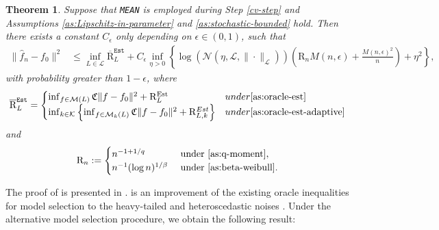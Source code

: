 \documentclass[12pt]{article}
\newtheorem{theorem}{Theorem}[section]
\begin{document}
\begin{theorem}\label{thm:R2Q2}
    Suppose that \texttt{MEAN} is employed during Step \ref{cv-step} and Assumptions \ref{as:Lipschitz-in-parameter} and \ref{as:stochastic-bounded} hold. Then there exists a constant $C_\epsilon$ only depending on $\epsilon \in (0,1)$, such that 
            \begin{equation}
            \begin{aligned}
        \|\widehat{f}_n-f_0\|^2 &\le  \inf_{L\in \mathcal{L}}\overline{\mathrm{R}}_L^{\mathtt{Est}} + C_\epsilon\inf _{\eta>0}\left\{\log \left(\mathcal{N}\left(\eta, \mathcal{L}, \|\cdot\|_{\mathcal{L}}\right)\right)\left(\mathrm{R}_n M(n,\epsilon)+\frac{M(n,\epsilon)^2}{n }\right)+\eta^2\right\},
            \end{aligned}
    \end{equation}
    with probability greater than $1-\epsilon$, where
    \begin{equation}\label{eq:estimationg_rate}
        \overline{\mathrm{R}}_{L}^{\mathtt{Est}} = 
        \begin{cases}
        \inf_{f\in \mathcal{M}(L)}\mathfrak{C}\|f - f_0\|^2 + \mathrm{R}_{L}^{\mathrm{Est}} & \textrm{under \Cref{as:oracle-est} } \\
       \inf_{k \in\mathcal{K} }\left\{\inf_{f\in \mathcal{M}_k(L)}\mathfrak{C}\| f-f_0\|^2 + \mathrm{R}_{L,k}^{\rm Est}\right\} & \textrm{under \Cref{as:oracle-est-adaptive} }
        \end{cases}
    \end{equation}
    and
    \begin{align}\label{eq:rate_under_LSE}
    	\mathrm{R}_n := \begin{cases}
    		n^{-1+1/q} &\text{ under }\Cref{as:q-moment},\\
    		n^{-1}(\log n)^{1/\beta} &\text{ under }\Cref{as:beta-weibull}.
    	\end{cases}
    \end{align}
\end{theorem}
The proof of  is presented in .  is an improvement of the existing oracle inequalities for model selection to the heavy-tailed and heteroscedastic noises \citep{massart2000some, gine2003ratio, vaart2006oracle, koltchinskii2011oracle}. Under the alternative model selection procedure, we obtain the following result:
\end{document}
